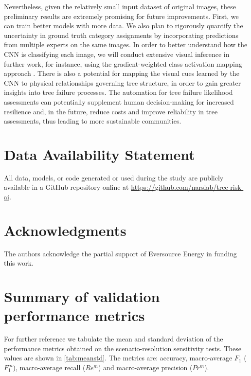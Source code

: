 \documentclass[NewProceedindgs, NoLineNumbers, SectionNumbers, letterpaper, SingleSpace, InsideFigs]{ascelike-new}
\begin{document}
Nevertheless, given the relatively small input dataset of original images, these preliminary results are extremely
promising for future improvements.  First, we can train better models with more data.  We also plan to rigorously
quantify the uncertainty in ground truth category assignments by incorporating predictions from multiple experts on the
same images.  In order to better understand how the CNN is classifying each image, we will conduct extensive visual
inference in further work, for instance, using the gradient-weighted class activation mapping approach
\cite{zeiler2014visualizing}.  There is also a potential for mapping the visual cues learned by the CNN to physical
relationships governing tree structure, in order to gain greater insights into tree failure processes.  The automation
for tree failure likelihood assessments can potentially supplement human decision-making for increased resilience and,
in the future, reduce costs and improve reliability in tree assessments, thus leading to more sustainable communities.


\section{Data Availability Statement}
All data, models, or code generated or used during the study are publicly available in a GitHub repository online at \url{https://github.com/narslab/tree-risk-ai}.

\section{Acknowledgments}
The authors acknowledge the partial support of Eversource Energy in funding this work.

\appendix
\section{Summary of validation performance metrics}
For further reference we tabulate the mean and standard deviation of the performance metrics obtained on the scenario-resolution sensitivity tests. These values are shown in \autoref{tab:meanstd}.
The metrics are: accuracy, macro-average $F_1$ ($F_1^m$), macro-average recall ($Re^m$) and macro-average precision ($Pr^m$).
\end{document}
